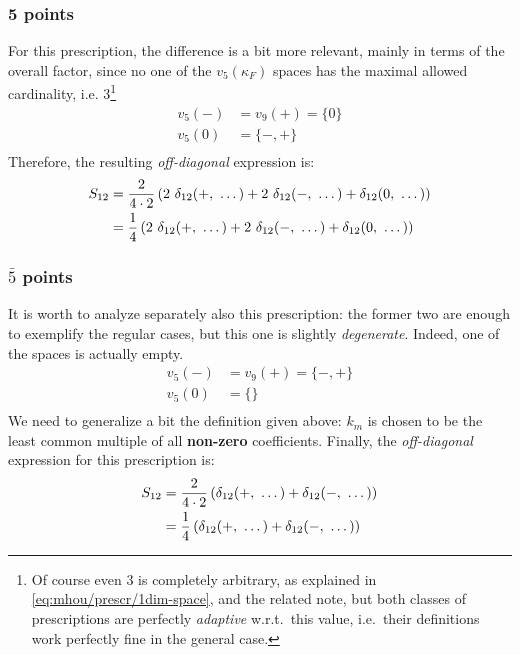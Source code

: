 \subsubsection{5 points}

For this prescription, the difference is a bit more relevant, mainly in terms
of the overall factor, since no one of the $v_5(\kappa_F)$ spaces has the
maximal allowed cardinality, i.e. $3$\footnote{
    Of course even 3 is completely arbitrary, as explained in
    \cref{eq:mhou/prescr/1dim-space}, and the related note, but both classes of
    prescriptions are perfectly \textit{adaptive} w.r.t.\ this value,
    i.e.\ their definitions work perfectly fine in the general case.
}
\begin{align}
    \label{eq:mhou/prescr/9specs-slices}
    v_5(-) &= v_9(+) = \{0\}\\
    v_5(0) &= \{-, +\}\\
\end{align}
Therefore, the resulting \textit{off-diagonal} expression is:
\begin{align}
    S_{12} &= \frac{2}{4 \cdot 2} \left(2\ \deltagroup{+} + 2\ \deltagroup{-} + \deltagroup{0}\right)\\
        &= \frac{1}{4} \left(2\ \deltagroup{+} + 2\ \deltagroup{-} + \deltagroup{0}\right)
\end{align}

\subsubsection{$\bar{5}$ points}

It is worth to analyze separately also this prescription: the former two are
enough to exemplify the regular cases, but this one is slightly
\textit{degenerate}.
Indeed, one of the spaces is actually empty.
\begin{align}
    \label{eq:mhou/prescr/5bar-specs-slices}
    v_5(-) &= v_9(+) = \{-, +\}\\
    v_5(0) &= \{\}\\
\end{align}
We need to generalize a bit the definition given above: $k_m$ is chosen to be
the least common multiple of all \textbf{non-zero} coefficients.
Finally, the \textit{off-diagonal} expression for this prescription is:
\begin{align}
    S_{12} &= \frac{2}{4 \cdot 2} \left(\delta_{12}(+,\ \dots) + \delta_{12}(-,\ \dots)\right)\\
        &= \frac{1}{4} \left(\delta_{12}(+,\ \dots) + \delta_{12}(-,\ \dots)\right)
\end{align}
